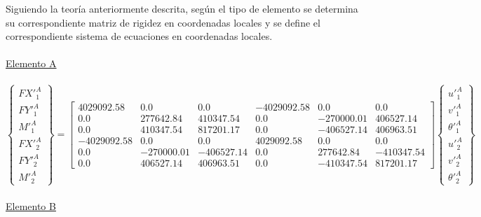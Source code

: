\documentclass[a4paper]{article}
\begin{document}
Siguiendo la teoría anteriormente descrita, según el tipo de elemento se determina su correspondiente matriz de rigidez en coordenadas locales y se define el correspondiente sistema de ecuaciones en coordenadas locales.\\
\\
\underline{Elemento A}
\\
\\
{
\renewcommand{\arraystretch}{1.7}
\begin{equation}
    \begin{Bmatrix}
        FX'_1^A\\
        FY'_1^A\\
        M'_1^A\\
        FX'_2^A\\
        FY'_2^A\\
        M'_2^A
    \end{Bmatrix} =
\left[\begin{matrix}4029092.58 & 0.0 & 0.0 & -4029092.58 & 0.0 & 0.0\\0.0 & 277642.84 & 410347.54 & 0.0 & -270000.01 & 406527.14\\0.0 & 410347.54 & 817201.17 & 0.0 & -406527.14 & 406963.51\\-4029092.58 & 0.0 & 0.0 & 4029092.58 & 0.0 & 0.0\\0.0 & -270000.01 & -406527.14 & 0.0 & 277642.84 & -410347.54\\0.0 & 406527.14 & 406963.51 & 0.0 & -410347.54 & 817201.17\end{matrix}\right]
    \begin{Bmatrix}
        u'_1^A\\
        v'_1^A\\
        \theta'_1^A\\
        u'_2^A\\
        v'_2^A\\
        \theta'_2^A
    \end{Bmatrix} 
\end{equation}
\\
}
\underline{Elemento B}
\\
\end{document}

